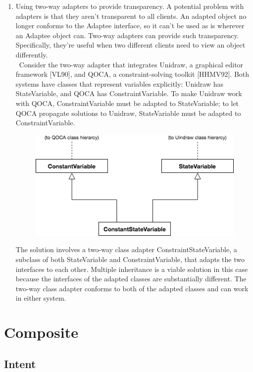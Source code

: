 \begin{enumerate}
    \item Using two-way adapters to provide transparency. A potential problem with adapters is that they aren't transparent to all clients. An adapted object no longer conforms to the Adaptee interface, so it can't be used as is wherever an Adaptee object can. Two-way adapters can provide such transparency. Specifically, they're useful when two different clients need to view an object differently.
    \\\
    Consider the two-way adapter that integrates Unidraw, a graphical editor framework [VL90], and QOCA, a constraint-solving toolkit [HHMV92]. Both systems have classes that represent variables explicitly: Unidraw has StateVariable, and QOCA has ConstraintVariable. To make Unidraw work with QOCA, ConstraintVariable must be adapted to StateVariable; to let QOCA propagate solutions to Unidraw, StateVariable must be adapted to ConstraintVariable.
    \begin{figure}[H]
    \centering
    \includegraphics[scale=0.6]{diagrams/adapter_consequence.png}
    \end{figure}
    The solution involves a two-way class adapter ConstraintStateVariable, a subclass of both StateVariable and ConstraintVariable, that adapts the two interfaces to each other. Multiple inheritance is a viable solution in this case because the interfaces of the adapted classes are substantially different. The two-way class adapter conforms to both of the adapted classes and can work in either system.
\end{enumerate}

\section{Composite}

\subsection*{Intent}

